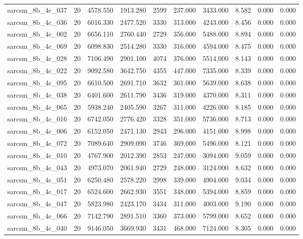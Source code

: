 \begin{tabular}{lrrrrrrrrr}
sarcsm\_8b\_4c\_037 & 20 & 4578.550 & 1913.280 & 2599 & 237.000 & 3433.000 & 8.582 & 0.000 & 0.000 \\
sarcsm\_8b\_4c\_036 & 20 & 6016.330 & 2477.520 & 3330 & 313.000 & 4243.000 & 8.456 & 0.000 & 0.000 \\
sarcsm\_8b\_4c\_002 & 20 & 6656.110 & 2760.440 & 2729 & 356.000 & 5488.000 & 8.894 & 0.000 & 0.000 \\
sarcsm\_8b\_4c\_069 & 20 & 6098.830 & 2514.280 & 3330 & 316.000 & 4594.000 & 8.475 & 0.000 & 0.000 \\
sarcsm\_8b\_4c\_028 & 20 & 7106.490 & 2901.100 & 4074 & 376.000 & 5514.000 & 8.143 & 0.000 & 0.000 \\
sarcsm\_8b\_4c\_022 & 20 & 9092.580 & 3642.750 & 4355 & 447.000 & 7335.000 & 8.339 & 0.000 & 0.000 \\
sarcsm\_8b\_4c\_095 & 20 & 6610.500 & 2691.710 & 3632 & 361.000 & 5639.000 & 8.638 & 0.000 & 0.000 \\
sarcsm\_8b\_4c\_038 & 20 & 6401.600 & 2611.790 & 3436 & 319.000 & 4370.000 & 8.311 & 0.000 & 0.000 \\
sarcsm\_8b\_4c\_065 & 20 & 5938.240 & 2405.590 & 3267 & 311.000 & 4226.000 & 8.185 & 0.000 & 0.000 \\
sarcsm\_8b\_4c\_016 & 20 & 6742.050 & 2776.420 & 3328 & 351.000 & 5736.000 & 8.713 & 0.000 & 0.000 \\
sarcsm\_8b\_4c\_006 & 20 & 6152.050 & 2471.130 & 2943 & 296.000 & 4151.000 & 8.998 & 0.000 & 0.000 \\
sarcsm\_8b\_4c\_072 & 20 & 7089.640 & 2909.090 & 3746 & 369.000 & 5496.000 & 8.121 & 0.000 & 0.000 \\
sarcsm\_8b\_4c\_010 & 20 & 4767.900 & 2012.390 & 2853 & 247.000 & 3094.000 & 9.059 & 0.000 & 0.000 \\
sarcsm\_8b\_4c\_043 & 20 & 4973.070 & 2061.940 & 2729 & 248.000 & 3124.000 & 8.632 & 0.000 & 0.000 \\
sarcsm\_8b\_4c\_051 & 20 & 6250.480 & 2578.220 & 2998 & 339.000 & 4904.000 & 9.034 & 0.000 & 0.000 \\
sarcsm\_8b\_4c\_017 & 20 & 6524.600 & 2662.930 & 3551 & 348.000 & 5394.000 & 8.859 & 0.000 & 0.000 \\
sarcsm\_8b\_4c\_047 & 20 & 5823.980 & 2423.170 & 3434 & 311.000 & 4003.000 & 9.190 & 0.000 & 0.000 \\
sarcsm\_8b\_4c\_066 & 20 & 7142.790 & 2891.510 & 3360 & 373.000 & 5799.000 & 8.652 & 0.000 & 0.000 \\
sarcsm\_8b\_4c\_040 & 20 & 9146.050 & 3669.930 & 3431 & 468.000 & 7124.000 & 8.305 & 0.000 & 0.000 \\

\end{tabular}
